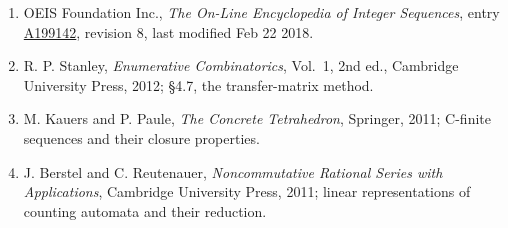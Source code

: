\documentclass[11pt]{article}
\theoremstyle{definition}
\begin{document}
\begin{enumerate}

\item OEIS Foundation Inc., \emph{The On-Line Encyclopedia of Integer Sequences}, entry \href{https://oeis.org/A199142}{A199142}, revision 8, last modified Feb 22 2018.

\item R. P. Stanley, \emph{Enumerative Combinatorics}, Vol.~1, 2nd ed., Cambridge University Press, 2012; \S4.7, the transfer-matrix method.

\item M. Kauers and P. Paule, \emph{The Concrete Tetrahedron}, Springer, 2011; C-finite sequences and their closure properties.

\item J. Berstel and C. Reutenauer, \emph{Noncommutative Rational Series with Applications}, Cambridge University Press, 2011; linear representations of counting automata and their reduction.

\end{enumerate}
\end{document}
